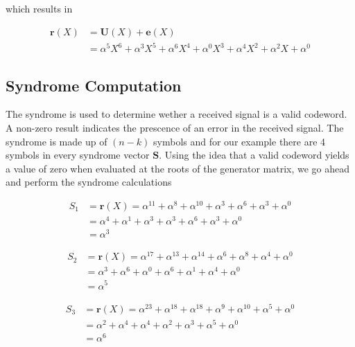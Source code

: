 \documentclass[fontsize=12pt]{article}
\begin{document}
which results in 

\begin{equation}
\begin{split}
 \mathbf{r}(X)&= \mathbf{U}(X)+ \mathbf{e}(X)\\
 &=\alpha^5X^6 + \alpha^3X^5 + \alpha^6X^4+\alpha^0X^3 + \alpha^4X^2 + \alpha^2X +\alpha^0
 \end{split}
\end{equation}

\subsection{Syndrome Computation}
The syndrome is used to determine wether a received signal is a valid codeword. A non-zero result indicates the prescence of an error in the  received signal. The syndrome is made up of $(n-k)$ symbols and for our example there are 4 symbols in every syndrome vector $\mathbf{S}$. Using the idea that a valid codeword yields a value of zero when evaluated at the roots of the generator matrix, we go ahead and perform the syndrome calculations

\begin{equation}
\begin{split}
 {S}_1& =\mathbf{r}(X)= \alpha^11 + \alpha^8+ \alpha^10+\alpha^3 + \alpha^6 + \alpha^3 +\alpha^0\\
 &=\alpha^4 + \alpha^1+ \alpha^3+\alpha^3 + \alpha^6 + \alpha^3 +\alpha^0\\
 &= \alpha^3
 \end{split}
\end{equation}

\begin{equation}
\begin{split}
{S}_2& =\mathbf{r}(X)= \alpha^17 + \alpha^13+ \alpha^14+\alpha^6 + \alpha^8 + \alpha^4 +\alpha^0\\
 &=\alpha^3 + \alpha^6+ \alpha^0+\alpha^6+ \alpha^1 + \alpha^4 +\alpha^0\\
 &= \alpha^5
 \end{split}
\end{equation}

\begin{equation}
\begin{split}
{S}_3& =\mathbf{r}(X)= \alpha^23 + \alpha^18+ \alpha^18+\alpha^9 + \alpha^10 + \alpha^5 +\alpha^0\\
 &=\alpha^2 + \alpha^4+ \alpha^4+\alpha^2 + \alpha^3 + \alpha^5 +\alpha^0\\
 &= \alpha^6
 \end{split}
\end{equation}
\end{document}
